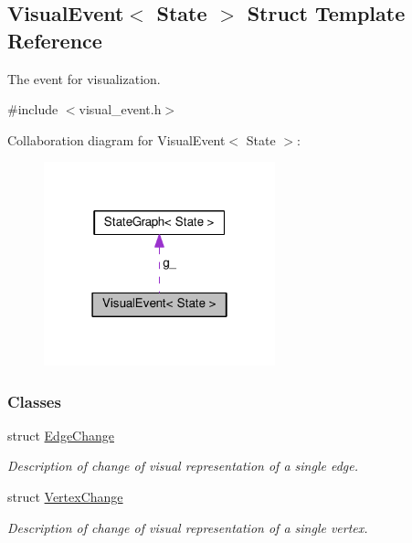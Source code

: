 \hypertarget{structVisualEvent}{}\subsection{Visual\+Event$<$ State $>$ Struct Template Reference}
\label{structVisualEvent}


The event for visualization.  




{\ttfamily \#include $<$visual\+\_\+event.\+h$>$}



Collaboration diagram for Visual\+Event$<$ State $>$\+:\nopagebreak
\begin{figure}[H]
\begin{center}
\leavevmode
\includegraphics[width=190pt]{structVisualEvent__coll__graph}
\end{center}
\end{figure}
\subsubsection*{Classes}
\begin{DoxyCompactItemize}
\item 
struct \hyperlink{structVisualEvent_1_1EdgeChange}{Edge\+Change}
\begin{DoxyCompactList}\small\item\em Description of change of visual representation of a single edge. \end{DoxyCompactList}\item 
struct \hyperlink{structVisualEvent_1_1VertexChange}{Vertex\+Change}
\begin{DoxyCompactList}\small\item\em Description of change of visual representation of a single vertex. \end{DoxyCompactList}\end{DoxyCompactItemize}
